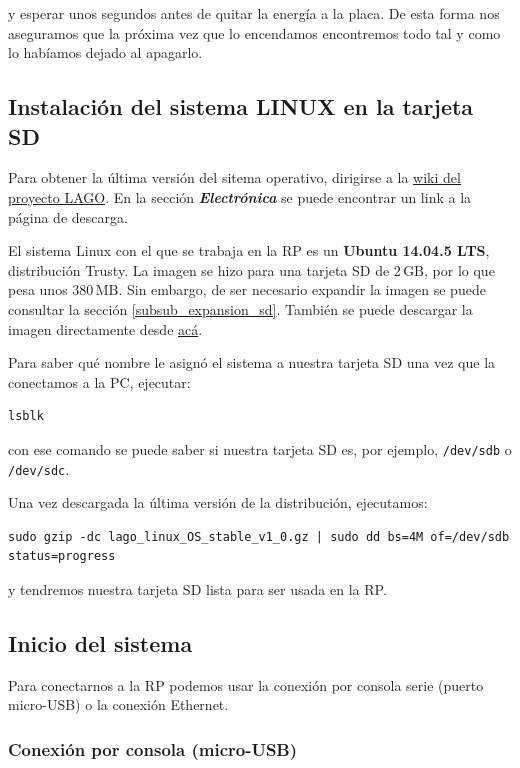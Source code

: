 \documentclass[a4paper,11pt]{article}
\begin{document}
\noindent y esperar unos segundos antes de quitar la energía a la placa. De esta
forma nos aseguramos que la próxima vez que lo encendamos encontremos todo tal
y como lo habíamos dejado al apagarlo.

\subsection{Instalación del sistema LINUX en la tarjeta SD}

Para obtener la última versión del sitema operativo, dirigirse a la
\href{http://wiki.lagoproject.net/index.php?title=Main\_Page}{wiki del proyecto
LAGO}. En la sección \textit{\textbf{Electrónica}} se puede encontrar un link a
la página de descarga. 

El sistema Linux con el que se trabaja en la RP es un \textbf{Ubuntu 14.04.5
LTS},
distribución Trusty. La imagen se hizo para una tarjeta SD de $2\,\text{GB}$, por lo que
pesa unos $380\,\text{MB}$. Sin embargo, de ser necesario expandir la imagen se puede
consultar la sección \ref{subsub_expansion_sd}.
También se puede descargar la imagen directamente desde
\href{https://mega.nz/#!BxZgmLjY!I8BuaMg53Kzo\_eZQKRjOMfJlu95qR2zWT\_BbRXjgNVQ}{acá}.   

\noindent Para saber qué nombre le asignó el sistema a nuestra tarjeta SD una
vez que la conectamos a la PC, ejecutar:
\begin{verbatim}
lsblk
\end{verbatim}
\noindent con ese comando se puede saber si nuestra tarjeta SD es, por ejemplo,
\texttt{/dev/sdb} o \texttt{/dev/sdc}.

\noindent Una vez descargada la última versión de la distribución, ejecutamos:

\begin{verbatim}
sudo gzip -dc lago_linux_OS_stable_v1_0.gz | sudo dd bs=4M of=/dev/sdb status=progress
\end{verbatim}

\noindent y tendremos nuestra tarjeta SD lista para ser usada en la RP.

\subsection{Inicio del sistema}

Para conectarnos a la RP podemos usar la conexión por consola serie (puerto
micro-USB) o la conexión Ethernet.

\subsubsection{Conexión por consola (micro-USB)}
\end{document}
